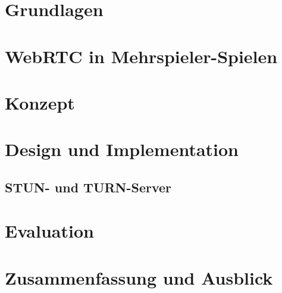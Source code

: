 \documentclass[oneside,11pt,a4paper,bibliography=totocnumbered,numbers=noenddot]{scrreprt}
\begin{document}
\chapter{Grundlagen}


\chapter{WebRTC in Mehrspieler-Spielen}


\chapter{Konzept}


\chapter{Design und Implementation}

\section{STUN- und TURN-Server}



\chapter{Evaluation}

\chapter{Zusammenfassung und Ausblick}
%

%

\begin{singlespace}

\end{singlespace}
\clearpage

\end{document}
